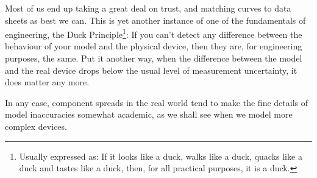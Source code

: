 \addvspace{12pt}

Most of us end up taking a great deal on trust, and matching curves to
data sheets as best we can.  This is yet another instance of one of
the fundamentals of engineering, the Duck Principle\footnote{Usually
expressed as: If it looks like a duck, walks like a duck, quacks like
a duck and tastes like a duck, then, for all practical purposes, it is
a duck.}: If you can't detect any difference between the behaviour of
your model and the physical device, then they are, for engineering
purposes, the same. Put it another way, when the difference between
the model and the real device drops below the usual level of
measurement uncertainty, it does matter any more.

\addvspace{12pt}

In any case, component spreads in the real world tend to make the fine
details of model inaccuracies somewhat academic, as we shall see when
we model more complex devices.
